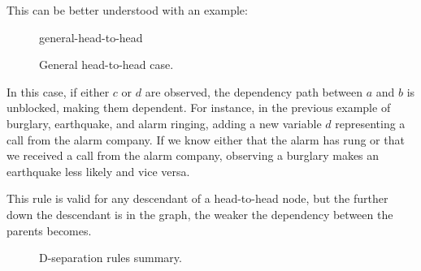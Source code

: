 This can be better understood with an example:
\begin{figure}[H]
    \centering
    {general-head-to-head}
    \caption{General head-to-head case.}
\end{figure}
In this case, if either $c$ or $d$ are observed, the dependency path between $a$ and $b$ is unblocked, making them dependent.
For instance, in the previous example of burglary, earthquake, and alarm ringing, adding a new variable $d$ representing a call from the alarm company.
If we know either that the alarm has rung or that we received a call from the alarm company,
observing a burglary makes an earthquake less likely and vice versa.

This rule is valid for any descendant of a head-to-head node, but the further down the descendant is in the graph, the weaker the dependency between the parents becomes.
\begin{figure}[H]
    \centering
    \caption{D-separation rules summary.}
\end{figure}

